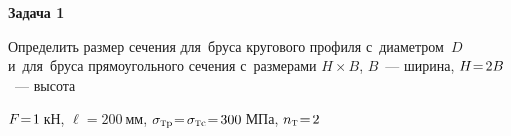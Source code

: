 \documentclass[14pt]{extarticle}
\begin{document}
\def\camerafirstangle{57} %
\def\camerasecondangle{142} %

\tdplotsetmaincoords{\camerafirstangle}{\camerasecondangle}

\begin{center}

\textbf{Задача 1\raisebox{.7ex}{\small я}}
\vspace{.4cm}

Определить размер сечения для~бруса кругового профиля с~диаметром~$D$
и~для~бруса прямоугольного сечения с~размерами ${H \!\times\! B}$\hbox{,\hspace{.2ex}} $B$~--- ширина\hbox{,\hspace{.2ex}} ${H \hspace{-.5ex}=\hspace{-.3ex} 2B}$~--- высота
\vspace{.6cm}


\vspace{.6cm}

${F \hspace{-.5ex}=\hspace{-.4ex} 1\:}$кН\hbox{,\hspace{.5ex}}
${\ell \!=\! 200\:}$мм\hbox{,\hspace{.5ex}}
${\sigma_{\mathrm{\scalebox{.6}{T}p}} \hspace{-.5ex}=\hspace{-.3ex} \sigma_{\mathrm{\scalebox{.6}{T}c}} \hspace{-.5ex}=\hspace{-.3ex} 300\:}$МПа\hbox{,\hspace{.5ex}}
${n_{\mathrm{\scalebox{.6}{T}}} \hspace{-.44ex}=\hspace{-.33ex} 2}$


\end{center}
\end{document}
